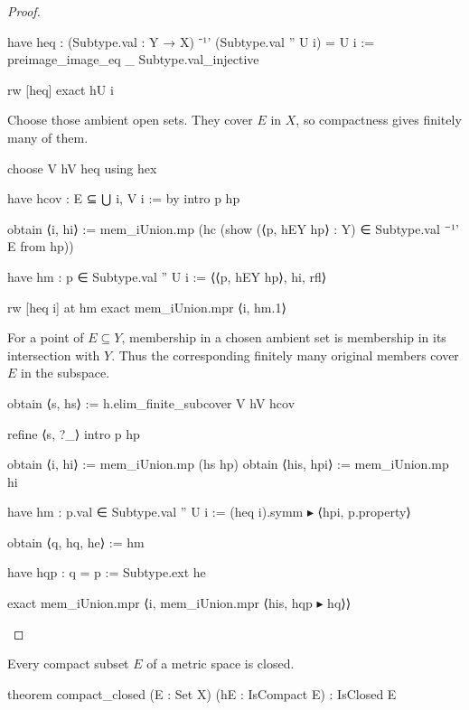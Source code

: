 \begin{proof}
\begin{lean}
        have heq : (Subtype.val : Y → X) ⁻¹' (Subtype.val '' U i) = U i :=
          preimage_image_eq _ Subtype.val_injective

        rw [heq]
        exact hU i
  \end{lean}

  Choose those ambient open sets.
  They cover $E$ in $X$, so compactness gives finitely many of them.

  \begin{lean}
    choose V hV heq using hex

    have hcov : E ⊆ ⋃ i, V i := by
      intro p hp

      obtain ⟨i, hi⟩ := mem_iUnion.mp (hc (show (⟨p, hEY hp⟩ : Y) ∈ Subtype.val ⁻¹' E from hp))

      have hm : p ∈ Subtype.val '' U i := ⟨⟨p, hEY hp⟩, hi, rfl⟩

      rw [heq i] at hm
      exact mem_iUnion.mpr ⟨i, hm.1⟩
  \end{lean}

  For a point of $E\subseteq Y$, membership in a chosen ambient set is membership in its
  intersection with $Y$.
  Thus the corresponding finitely many original members cover $E$ in the subspace.

  \begin{lean}
    obtain ⟨s, hs⟩ := h.elim_finite_subcover V hV hcov

    refine ⟨s, ?_⟩
    intro p hp

    obtain ⟨i, hi⟩ := mem_iUnion.mp (hs hp)
    obtain ⟨his, hpi⟩ := mem_iUnion.mp hi

    have hm : p.val ∈ Subtype.val '' U i := (heq i).symm ▸ ⟨hpi, p.property⟩

    obtain ⟨q, hq, he⟩ := hm

    have hqp : q = p := Subtype.ext he

    exact mem_iUnion.mpr ⟨i, mem_iUnion.mpr ⟨his, hqp ▸ hq⟩⟩
  \end{lean}

\end{proof}

\begin{proposition}
  \label{ma:thm:compact-set-is-closed}
  Every compact subset $E$ of a metric space is closed.

  \begin{lean}
    theorem compact_closed (E : Set X) (hE : IsCompact E) : IsClosed E
  \end{lean}
\end{proposition}

